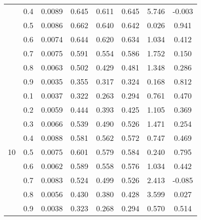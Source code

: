 \documentclass[11pt,a4paper]{report}
\begin{document}
\begin{longtable}{ | c | c || c | c | c | c | c | c | }
 & 0.4 & 0.0089 & 0.645 & 0.611 & 0.645 & 5.746 & -0.003 \\
 & 0.5 & 0.0086 & 0.662 & 0.640 & 0.642 & 0.026 & 0.941 \\
 & 0.6 & 0.0074 & 0.644 & 0.620 & 0.634 & 1.034 & 0.412 \\
 & 0.7 & 0.0075 & 0.591 & 0.554 & 0.586 & 1.752 & 0.150 \\
 & 0.8 & 0.0063 & 0.502 & 0.429 & 0.481 & 1.348 & 0.286 \\
 & 0.9 & 0.0035 & 0.355 & 0.317 & 0.324 & 0.168 & 0.812 \\
 \hline
\multirow{9}{*}{10} & 0.1 & 0.0037 & 0.322 & 0.263 & 0.294 & 0.761 & 0.470 \\
 & 0.2 & 0.0059 & 0.444 & 0.393 & 0.425 & 1.105 & 0.369 \\
 & 0.3 & 0.0066 & 0.539 & 0.490 & 0.526 & 1.471 & 0.254 \\
 & 0.4 & 0.0088 & 0.581 & 0.562 & 0.572 & 0.747 & 0.469 \\
 & 0.5 & 0.0075 & 0.601 & 0.579 & 0.584 & 0.240 & 0.795 \\
 & 0.6 & 0.0062 & 0.589 & 0.558 & 0.576 & 1.034 & 0.442 \\
 & 0.7 & 0.0083 & 0.524 & 0.499 & 0.526 & 2.413 & -0.085 \\
 & 0.8 & 0.0056 & 0.430 & 0.380 & 0.428 & 3.599 & 0.027 \\
 & 0.9 & 0.0038 & 0.323 & 0.268 & 0.294 & 0.570 & 0.514 \\
 \hline
\hline
\end{longtable}
\end{document}

